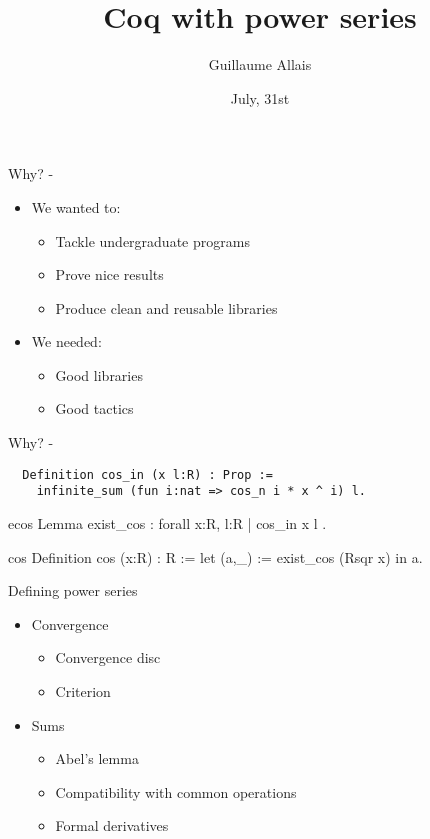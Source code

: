 \documentclass{beamer}
\author{Guillaume Allais}
\title{Coq with power series}
\institute{\coqtail{} Junior Laboratory\\
	ENS Lyon}
\date{July, 31st}
\begin{document}
\begin{frame}[t,plain]
\titlepage
\end{frame}

\begin{frame}{Why? - \coqtail{}}
\begin{itemize}
 \item We wanted to:
   \begin{itemize}
     \item Tackle undergraduate programs
     \item Prove nice results
     \item Produce clean and reusable libraries
   \end{itemize}
   \bigskip
 \item We needed:
   \begin{itemize}
     \item Good libraries 
     \item Good tactics
   \end{itemize}
\end{itemize}
\end{frame}

\begin{frame}[fragile,t]{Why? - \rpser{}}
\begin{verbatim}
  Definition cos_in (x l:R) : Prop :=
    infinite_sum (fun i:nat => cos_n i * x ^ i) l.
\end{verbatim}

\begin{SaveVerbatim}{ecos}
  Lemma exist_cos : forall x:R, { l:R | cos_in x l }.
\end{SaveVerbatim}

\begin{SaveVerbatim}{cos}
  Definition cos (x:R) : R := let (a,_) :=
    exist_cos (Rsqr x) in a.
\end{SaveVerbatim}

{
\bigskip
\color{red}{But $\cos$ is much more than just a series!}
}
\end{frame}

\begin{frame}{Defining power series}
\begin{itemize}
\item Convergence
  \begin{itemize}
    \item Convergence disc
    \item Criterion
  \end{itemize}
\item Sums
  \begin{itemize}
    \item Abel's lemma
    \item Compatibility with common operations
    \item Formal derivatives
  \end{itemize}
\end{itemize}
\end{frame}
\end{document}
